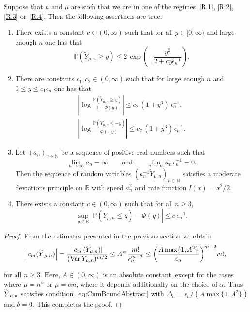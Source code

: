 \documentclass[AHL,Unicode,longabstracts,published]{cedram}
\newcommand{\R}{\mathbb{R}}
\newcommand{\N}{\mathbb{N}}
\newcommand{\PP}{\mathbb{P}}
\newcommand{\Var}{\mathop{\mathrm{Var}}\nolimits}
\newcommand*{\romanenumi}{\renewcommand*{\theenumi}{\roman{enumi}}}
\let\oldtilde\tilde
\renewcommand*{\tilde}[1]{\mathchoice{\widetilde{#1}}{\widetilde{#1}}{\oldtilde{#1}}{\oldtilde{#1}}}
\begin{document}
\begin{theo}\label{thm:Main}
Suppose that $n$ and $\mu$ are such that we are in one of the regimes~\eqref{R.1}, \eqref{R.2}, \eqref{R.3} or~\eqref{R.4}. Then the following assertions are true.
\begin{enumerate}\romanenumi
\item\label{list4.4.1} There exists a constant $c\in(0,\infty)$ such that for all $y\in[0,\infty)$ and large enough $n$ one has that
\[
\PP\left(\widetilde{Y}_{\mu,n}\geq y\right) \leq 2\,\exp\left(-\frac{y^2}{2+cy\epsilon_n^{-1}}\right).
\]

\item\label{list4.4.2} There are constants $c_1,c_2\in(0,\infty)$ such that for large enough $n$ and\linebreak$0\leq y\leq c_1\epsilon_n$ one has that
\begin{align*}
\left|\log\frac{\PP\left(\widetilde{Y}_{\mu,n}\geq y\right)}{1-\Phi(y)}\right| \leq c_2\,\left(1+y^3\right)\,\epsilon_n^{-1},\\
\left|\log\frac{\PP\left(\widetilde{Y}_{\mu,n}\leq -y\right)}{\Phi(-y)}\right| \leq c_2\,\left(1+y^3\right)\,\epsilon_n^{-1}.
\end{align*}

\item\label{list4.4.3} Let $(a_n)_{n\in\N}$ be a sequence of positive real numbers such that
\[
\lim_{n\to\infty}a_n=\infty\qquad\text{and}\qquad \lim_{n\to\infty}a_n\,\epsilon_n^{-1} = 0.
\]
Then the sequence of random variables $(a_n^{-1}\widetilde{Y}_{\mu,n})_{n\in\N}$ satisfies a moderate deviations principle on $\R$ with speed $a_n^2$ and rate function $I(x)=x^2/2$.

\item \label{list4.4.4}There exists a constant $c\in(0,\infty)$ such that for all $n\geq 3$,
\[
\sup_{y\in\R}\left|\PP\left(\widetilde{Y}_{\mu,n}\leq y\right)-\Phi(y)\right| \leq c\,\epsilon_n^{-1}.
\]
\end{enumerate}
\end{theo}
\begin{proof}
From the estimates presented in the previous section we obtain
\[
\left|c_m(\tilde Y_{\mu, n})\right|=\frac{\left|c_m\left(Y_{\mu, n}\right)\right|}{(\Var Y_{\mu, n})^{m/2}}\leq A^m\frac{m!}{\epsilon_n^{m-2}}\leq\bigg(\frac{A\max\{1,A^2\}}{\epsilon_n}\bigg)^{m-2}m!,
\]

for all $n\geq 3$. Here, $A\in(0,\infty)$ is an absolute constant, except for the cases where $\mu=n^\alpha$ or $\mu=\alpha n$, where it depends additionally on the choice of $\alpha$. Thus $\tilde Y_{\mu, n}$ satisfies condition~\eqref{eq:CumBoundAbstract} with $\Delta_n=\epsilon_n/(A\max\{1,A^2\})$ and $\delta=0$. This completes the proof.
\end{proof}
\end{document}
